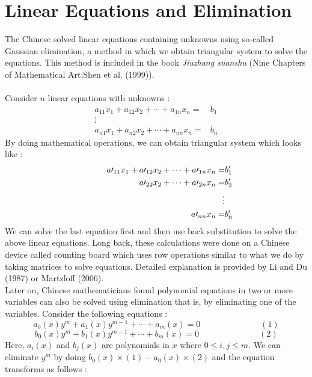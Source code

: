 \documentclass[a4paper,reqno,11pt]{amsart}
\theoremstyle{plain}%
\theoremstyle{definition}
\theoremstyle{remark}
\begin{document}
\section{Linear Equations and Elimination}
The Chinese solved linear equations containing unknowns using so-called Gaussian elimination, a method in which we obtain triangular system to solve the equations. This method is included in the book \textit{Jiuzhang suanshu} (Nine Chapters of Mathematical Art;Shen et al. (1999)).\\
\\
Consider $n$ linear equations with unknowns :\\
\begin{align*}
a_{11}x_{1} + a_{12}x_{2} + \cdots + a_{1n}x_{n} =& b_{1}\\
\vdots&\\
a_{n1}x_{1} + a_{n2}x_{2} + \cdots + a_{nn}x_{n} =& b_{n}
\end{align*}
By doing mathematical operations, we can obtain triangular system which looks like :\\
\begin{align*}
a\prime_{11}x_{1} + a\prime_{12}x_{2} + \cdots + a\prime_{1n}x_{n} =& b'_{1}\\
\indent \hspace{2cm} a\prime_{22}x_{2} + \cdots + a\prime_{2n}x_{n} =& b'_{2}\\
\vdots&\\
a\prime_{nn}x_{n} =& b'_{n}\\
\end{align*}
We can solve the last equation first and then use back substitution to solve the above linear equations. Long back, these calculations were done on a Chinese device called counting board which uses row operations similar to what we do by taking matrices to solve equations. Detailed explanation is provided by Li and Du (1987) or Martzloff (2006).\\
Later on, Chinese mathematicians found polynomial equations in two or
more variables can also be solved using elimination that is, by eliminating one of the variables. Consider the following equations :\\
$$a_{0}(x)y^m + a_{1}(x)y^{m-1} + \cdots + a_{m}(x) = 0 \hspace{3cm} (1)$$
$$b_{0}(x)y^m + b_{1}(x)y^{m-1} + \cdots + b_{m}(x) = 0 \hspace{3cm} (2)$$
Here, $a_{i}(x)$ and $b_{j}(x)$ are polynomials in $x$ where $0 \leq i,j \leq m.$ We can eliminate $y^m$ by doing $b_{0}(x) \times (1) - a_{0}(x) \times (2)$ and the equation transforms as follows :
\end{document}
